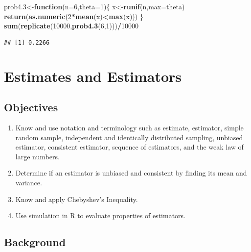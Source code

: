 \documentclass[]{book}
\newenvironment{Shaded}{\begin{snugshade}}{\end{snugshade}}
\newcommand{\KeywordTok}[1]{\textcolor[rgb]{0.13,0.29,0.53}{\textbf{#1}}}
\newcommand{\DataTypeTok}[1]{\textcolor[rgb]{0.13,0.29,0.53}{#1}}
\newcommand{\DecValTok}[1]{\textcolor[rgb]{0.00,0.00,0.81}{#1}}
\newcommand{\ControlFlowTok}[1]{\textcolor[rgb]{0.13,0.29,0.53}{\textbf{#1}}}
\newcommand{\OperatorTok}[1]{\textcolor[rgb]{0.81,0.36,0.00}{\textbf{#1}}}
\newcommand{\NormalTok}[1]{#1}
\providecommand{\tightlist}{%
  \setlength{\itemsep}{0pt}\setlength{\parskip}{0pt}}
\theoremstyle{definition}
\theoremstyle{definition}
\theoremstyle{definition}
\theoremstyle{remark}
\begin{document}
\begin{Shaded}
\begin{Highlighting}[]
\NormalTok{prob4.}\DecValTok{3}\NormalTok{<-}\ControlFlowTok{function}\NormalTok{(}\DataTypeTok{n=}\DecValTok{6}\NormalTok{,}\DataTypeTok{theta=}\DecValTok{1}\NormalTok{)\{}
\NormalTok{    x<-}\KeywordTok{runif}\NormalTok{(n,}\DataTypeTok{max=}\NormalTok{theta)}
    \KeywordTok{return}\NormalTok{(}\KeywordTok{as.numeric}\NormalTok{(}\DecValTok{2}\OperatorTok{*}\KeywordTok{mean}\NormalTok{(x)}\OperatorTok{<}\KeywordTok{max}\NormalTok{(x)))}
\NormalTok{\}}
\KeywordTok{sum}\NormalTok{(}\KeywordTok{replicate}\NormalTok{(}\DecValTok{10000}\NormalTok{,}\KeywordTok{prob4.3}\NormalTok{(}\DecValTok{6}\NormalTok{,}\DecValTok{1}\NormalTok{)))}\OperatorTok{/}\DecValTok{10000}
\end{Highlighting}
\end{Shaded}

\begin{verbatim}
## [1] 0.2266
\end{verbatim}

\hypertarget{L19}{\section{Estimates and Estimators}\label{L19}}

\subsection{Objectives}\label{objectives-18}

\begin{enumerate}
\def\labelenumi{\arabic{enumi}.}
\tightlist
\item
  Know and use notation and terminology such as estimate, estimator,
  simple random sample, independent and identically distributed
  sampling, unbiased estimator, consistent estimator, sequence of
  estimators, and the weak law of large numbers.\\
\item
  Determine if an estimator is unbiased and consistent by finding its
  mean and variance.\\
\item
  Know and apply Chebyshev's Inequality.\\
\item
  Use simulation in R to evaluate properties of estimators.
\end{enumerate}

\subsection{Background}\label{background-3}
\end{document}
